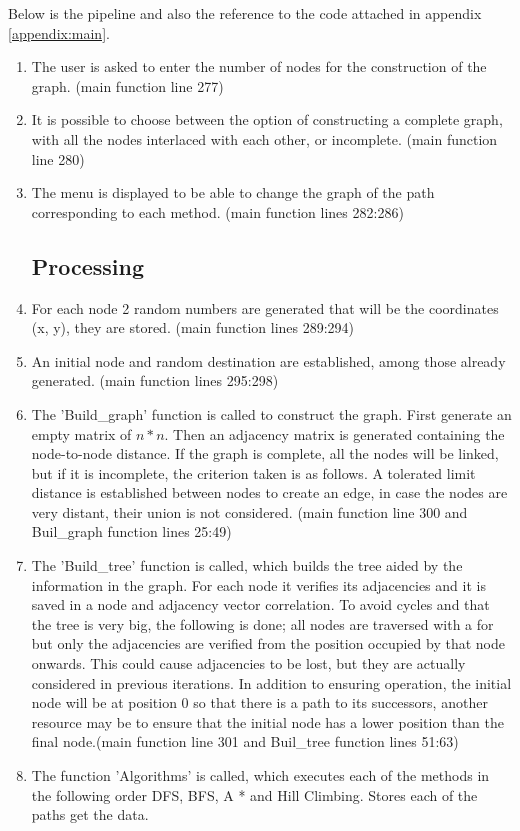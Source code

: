 \documentclass[11pt]{article}
\begin{document}
Below is the pipeline and also the reference to the code attached in appendix \ref{appendix:main}.
\begin{enumerate}
    \subsection{Input}
    \item The user is asked to enter the number of nodes for the construction of the graph. (main function line 277)
    \item It is possible to choose between the option of constructing a complete graph, with all the nodes interlaced with each other, or incomplete. (main function line 280)
    \item The menu is displayed to be able to change the graph of the path corresponding to each method. (main function lines 282:286)
    \subsection{Processing}
    \item For each node 2 random numbers are generated that will be the coordinates (x, y), they are stored. (main function lines 289:294)
    \item An initial node and random destination are established, among those already generated. (main function lines 295:298)
    \item The 'Build\_graph' function is called to construct the graph. First generate an empty matrix of $n*n$. Then an adjacency matrix is generated containing the node-to-node distance. If the graph is complete, all the nodes will be linked, but if it is incomplete, the criterion taken is as follows. A tolerated limit distance is established between nodes to create an edge, in case the nodes are very distant, their union is not considered. (main function line 300 and Buil\_graph function lines 25:49)
    \item The 'Build\_tree' function is called, which builds the tree aided by the information in the graph. For each node it verifies its adjacencies and it is saved in a node and adjacency vector correlation. To avoid cycles and that the tree is very big, the following is done; all nodes are traversed with a for but only the adjacencies are verified from the position occupied by that node onwards. This could cause adjacencies to be lost, but they are actually considered in previous iterations. In addition to ensuring operation, the initial node will be at position 0 so that there is a path to its successors, another resource may be to ensure that the initial node has a lower position than the final node.(main function line 301 and Buil\_tree function lines 51:63)
    \item The function 'Algorithms' is called, which executes each of the methods in the following order DFS, BFS, A * and Hill Climbing. Stores each of the paths get the data. 

\end{enumerate}
\end{document}
